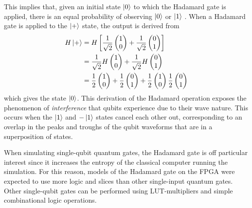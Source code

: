 This implies that, given an initial state $\ket{0}$ to which the Hadamard gate is applied, there is an equal probability of observing $\ket{0}$ or $\ket{1}$ \cite{DeWolf2019}. When a Hadamard gate is applied to the $\ket{+}$ state, the output is derived from
\begin{align}
	H\ket{+} & = H\left[\frac{1}{\sqrt{2}}\left(\begin{matrix}
						1\\0
	\end{matrix}\right) + \frac{1}{\sqrt{2}}\left(\begin{matrix}
	0\\1
\end{matrix}\right)\right]\nonumber\\
& = \frac{1}{\sqrt{2}}H\left(\begin{matrix}
	1\\0
\end{matrix}\right) + \frac{1}{\sqrt{2}}H\left(\begin{matrix}
	0\\1
\end{matrix}\right)\nonumber\\
& = \frac{1}{2}\left(\begin{matrix}
	1\\0
\end{matrix}\right) + \frac{1}{2}\left(\begin{matrix}
	0\\1
\end{matrix}\right) + \frac{1}{2}\left(\begin{matrix}
1\\0
\end{matrix}\right)  \frac{1}{2}\left(\begin{matrix}
0\\1
\end{matrix}\right)\nonumber
\end{align}
which gives the state $\ket{0}$. This derivation of the Hadamard operation exposes the phenomenon of \textit{interference} that qubits experience due to their wave nature. This occurs when the $\ket{1}$ and $-\ket{1}$ states cancel each other out, corresponding to an overlap in the peaks and troughs of the qubit waveforms that are in a superposition of states.

When simulating single-qubit quantum gates, the Hadamard gate is off particular interest since it increases the entropy of the classical computer running the simulation. For this reason, models of the Hadamard gate on the FPGA were expected to use more logic and slices than other single-input quantum gates. Other single-qubit gates can be performed using LUT-multipliers and simple combinational logic operations. 
 
